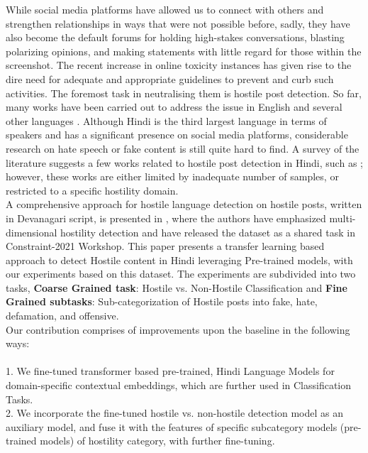 \documentclass[runningheads]{llncs}
\begin{document}
While social media platforms have allowed us to connect with others and strengthen relationships in ways that were not possible before, sadly, they have also become the default forums for holding high-stakes conversations, blasting polarizing opinions, and making statements with little regard for those within the screenshot. The recent increase in online toxicity instances has given rise to the dire need for adequate and appropriate guidelines to prevent and curb such activities. The foremost task in neutralising them is hostile post detection. So far, many works have been carried out to address the issue in English \cite{Nobata2016AbusiveLD,waseem-etal-2017-understanding} and several other languages \cite{ref_arabic,ref_german}. Although Hindi is the third largest language in terms of speakers and has a significant presence on social media platforms, considerable research on hate speech or fake content is still quite hard to find. A survey of the literature suggests a few works related to hostile post detection in Hindi, such as \cite{JHA20202324,safi-samghabadi-etal-2020-aggression}; however, these works are either limited by inadequate number of samples, or restricted to a specific hostility domain.\\

A comprehensive approach for hostile language detection on hostile posts, written in Devanagari script, is presented in \cite{bhardwaj2020hostility}, where the authors have emphasized multi-dimensional hostility detection and have released the dataset as a shared task in Constraint-2021 Workshop. This paper presents a transfer learning based approach to detect Hostile content in Hindi leveraging Pre-trained models, with our experiments based on this dataset. The experiments are subdivided into two tasks, \textbf{Coarse Grained task}: Hostile vs. Non-Hostile Classification and \textbf{Fine Grained subtasks}: Sub-categorization of Hostile posts into fake, hate, defamation, and offensive.
\\

\noindent Our contribution comprises of improvements upon the baseline in the following ways:\\
\\
1. We fine-tuned transformer based pre-trained, Hindi Language Models for domain-specific contextual embeddings, which are further used in Classification Tasks.\\
2. We incorporate the fine-tuned hostile vs. non-hostile detection model as an auxiliary model, and fuse it with the features of specific subcategory models (pre-trained models) of hostility category, with further fine-tuning.\\
\end{document}
